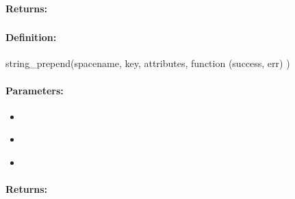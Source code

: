 \paragraph{Returns:}


\pagebreak
\subsubsection{}
\label{api:nodejs:string_prepend}


\paragraph{Definition:}
\begin{javascriptcode}
string_prepend(spacename, key, attributes, function (success, err) {})
\end{javascriptcode}
\paragraph{Parameters:}
\begin{itemize}[noitemsep]
\item {}\\

\item {}\\

\item {}\\

\end{itemize}

\paragraph{Returns:}


\pagebreak
\subsubsection{}
\label{api:nodejs:cond_string_prepend}


